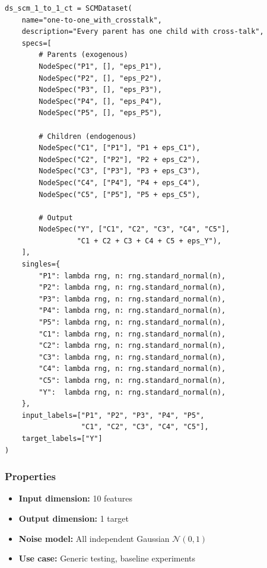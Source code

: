 \documentclass[11pt,a4paper]{article}
\begin{document}
\begin{lstlisting}[caption={One-to-One Cross-Talk Dataset Definition}]
ds_scm_1_to_1_ct = SCMDataset(
    name="one-to-one_with_crosstalk",
    description="Every parent has one child with cross-talk",
    specs=[
        # Parents (exogenous)
        NodeSpec("P1", [], "eps_P1"),
        NodeSpec("P2", [], "eps_P2"),
        NodeSpec("P3", [], "eps_P3"),
        NodeSpec("P4", [], "eps_P4"),
        NodeSpec("P5", [], "eps_P5"),

        # Children (endogenous)
        NodeSpec("C1", ["P1"], "P1 + eps_C1"),
        NodeSpec("C2", ["P2"], "P2 + eps_C2"),
        NodeSpec("C3", ["P3"], "P3 + eps_C3"),
        NodeSpec("C4", ["P4"], "P4 + eps_C4"),
        NodeSpec("C5", ["P5"], "P5 + eps_C5"),

        # Output
        NodeSpec("Y", ["C1", "C2", "C3", "C4", "C5"],
                 "C1 + C2 + C3 + C4 + C5 + eps_Y"),
    ],
    singles={
        "P1": lambda rng, n: rng.standard_normal(n),
        "P2": lambda rng, n: rng.standard_normal(n),
        "P3": lambda rng, n: rng.standard_normal(n),
        "P4": lambda rng, n: rng.standard_normal(n),
        "P5": lambda rng, n: rng.standard_normal(n),
        "C1": lambda rng, n: rng.standard_normal(n),
        "C2": lambda rng, n: rng.standard_normal(n),
        "C3": lambda rng, n: rng.standard_normal(n),
        "C4": lambda rng, n: rng.standard_normal(n),
        "C5": lambda rng, n: rng.standard_normal(n),
        "Y":  lambda rng, n: rng.standard_normal(n),
    },
    input_labels=["P1", "P2", "P3", "P4", "P5",
                  "C1", "C2", "C3", "C4", "C5"],
    target_labels=["Y"]
)
\end{lstlisting}

\subsubsection{Properties}

\begin{itemize}
    \item \textbf{Input dimension:} 10 features
    \item \textbf{Output dimension:} 1 target
    \item \textbf{Noise model:} All independent Gaussian $\mathcal{N}(0,1)$
    \item \textbf{Use case:} Generic testing, baseline experiments
\end{itemize}

\end{document}
